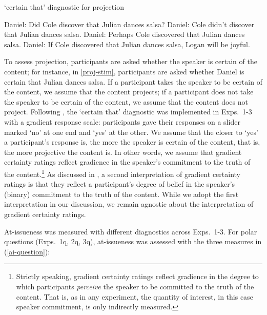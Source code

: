 \documentclass[11pt,fleqn]{article}
\newcommand{\6}{\mbox{$[\hspace*{-.6mm}[$}}
\newcommand{\9}{\mbox{$]\hspace*{-.6mm}]$}}
\begin{document}
\begin{exe}

\ex\label{proj-stim} `certain that' diagnostic for projection
\begin{xlist}
\ex Daniel: Did Cole discover that Julian dances salsa?
\ex Daniel: Cole didn't discover that Julian dances salsa.
\ex Daniel: Perhaps Cole discovered that Julian dances salsa.
\ex Daniel: If Cole discovered that Julian dances salsa, Logan will be joyful.
\end{xlist}
\end{exe}
To assess projection, participants are asked whether the speaker is certain of the content; for instance, in \ref{proj-stim}, participants are asked whether Daniel is certain that Julian dances salsa. If a participant takes the speaker to be certain of the content, we assume that the content projects; if a participant does not take the speaker to be certain of the content, we assume that the content does not project. Following \citealt{tbd-variability}, the `certain that' diagnostic was implemented in Exps.~1-3 with a gradient response scale: participants gave their responses on a slider marked `no' at one end and `yes' at the other. We assume that the closer to `yes' a participant's response is, the more the speaker is certain of the content, that is, the more projective the content is. In other words, we assume that gradient certainty ratings reflect gradience in the speaker's commitment to the truth of the content.\footnote{Strictly speaking,  gradient certainty ratings reflect gradience in the degree to which participants \emph{perceive} the speaker to be committed to the truth of the content. That is, as in any experiment, the quantity of interest, in this case speaker commitment, is only indirectly measured.} As discussed in \citealt{tbd-variability}, a second interpretation of gradient certainty ratings is that they reflect a participant's degree of belief in the speaker's (binary) commitment to the truth of the content. While we adopt the first interpretation in our discussion, we remain agnostic about the interpretation of gradient certainty ratings. 

At-issueness was measured with different diagnostics across Exps.~1-3. For polar questions (Exps.~1q, 2q, 3q), at-issueness was assessed with the three measures in (\ref{ai-question}):
\end{document}
